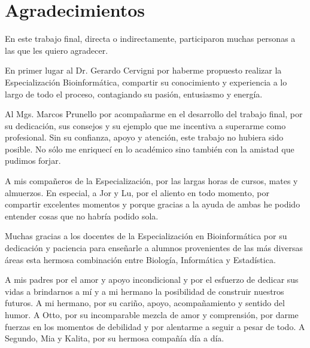 
\chapter*{Agradecimientos}


En este trabajo final, directa o indirectamente, participaron muchas personas a las que les quiero agradecer.

En primer lugar al Dr. Gerardo Cervigni por haberme propuesto realizar la Especialización Bioinformática, compartir su conocimiento y experiencia a lo largo de todo el proceso, contagiando su pasión, entusiasmo y energía. 

Al Mgs. Marcos Prunello por acompañarme en el desarrollo del trabajo final, por su dedicación, sus consejos y su ejemplo que me incentiva a superarme como profesional. Sin su confianza, apoyo y atención, este trabajo no hubiera sido posible. No sólo me enriquecí en lo académico sino también con la amistad que pudimos forjar. 

A mis compañeros de la Especialización, por las largas horas de cursos, mates y almuerzos. En especial, a Jor y Lu, por el aliento en todo momento, por compartir excelentes momentos y porque gracias a la ayuda de ambas he podido entender cosas que no habría podido sola.

Muchas gracias a los docentes de la Especialización en Bioinformática por su dedicación y paciencia para enseñarle a alumnos provenientes de las más diversas áreas esta hermosa combinación entre Biología, Informática y Estadística.

A mis padres por el amor y apoyo incondicional y por el esfuerzo  de  dedicar  sus  vidas  a  brindarnos  a  mí  y  a  mi  hermano  la  posibilidad  de construir nuestros futuros. A mi hermano, por su cariño, apoyo, acompañamiento y sentido del humor. A Otto, por su incomparable mezcla de amor y comprensión, por darme fuerzas en los momentos de debilidad y por alentarme a seguir a pesar de todo. A Segundo, Mia y Kalita, por su hermosa compañía día a día.


